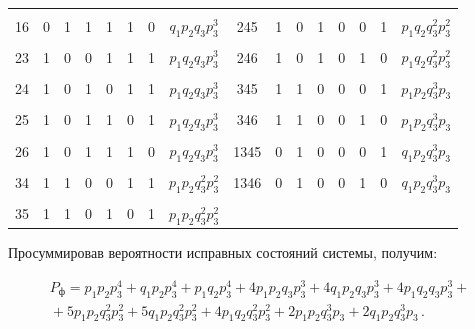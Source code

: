 \begin{table}[b]
\begin{center}
\begin{tabular}{|c|c|c|c|c|c|c|c|c|c|c|c|c|c|c|c|}
&&&&&&&&&&&&&&&\\[-9pt]

16&0&1&1&1&1&0&$q_1p_2q_3p_3^3$&245&1&0& 1&0&0& 1&$p_1q_2q_3^2p_3^2$\\

&&&&&&&&&&&&&&&\\[-9pt]

23&1&0&0&1&1&1&$p_1q_2q_3p_3^3$&246&1&0& 1&0& 1&0&$p_1q_2q_3^2p_3^2$\\

&&&&&&&&&&&&&&&\\[-9pt]

24&1&0&1&0&1&1&$p_1q_2q_3p_3^3$&345&1&1&0&0&0&1&$p_1p_2q_3^3p_3$\\

&&&&&&&&&&&&&&&\\[-9pt]

25&1&0&1&1&0&1&$p_1q_2q_3p_3^3$&346&1&1&0&0&1&0&$p_1p_2q_3^3p_3$\\

&&&&&&&&&&&&&&&\\[-9pt]

26&1&0&1&1&1&0&$p_1q_2q_3p_3^3$&1345\hphantom{9}&0&1&0&0&0&1&$q_1p_2q_3^3p_3$\\

&&&&&&&&&&&&&&&\\[-9pt]

34&1&1&0&0&1&1&$p_1p_2q_3^2p_3^2$&1346\hphantom{9}&0&1&0&0&1&0&$q_1p_2q_3^3p_3$\\

&&&&&&&&&&&&&&&\\[-9pt]

35&1&1&0&1&0&1&$p_1p_2q_3^2p_3^2$&&&&&&&&\\

\hline

\end{tabular}

\end{center}

\end{table}

      

      Просуммировав вероятности исправных состояний системы, получим: 

      \begin{multline*}

P_{\mathrm{ф}} = p_1p_2p_3^4 + q_1p_2p_3^4 + p_1q_2p_3^4 + 4p_1p_2q_3p_3^3 + 

4q_1p_2q_3p_3^3 + 4p_1q_2q_3p_3^3 + {}\\[6pt]

{}+ 5p_1p_2q_3^2p_3^2 + 5q_1p_2q_3^2p_3^2 + 4p_1q_2q_3^2p_3^2 + 2p_1p_2q_3^3p_3 + 

2q_1p_2q_3^3p_3\,.

\end{multline*}



